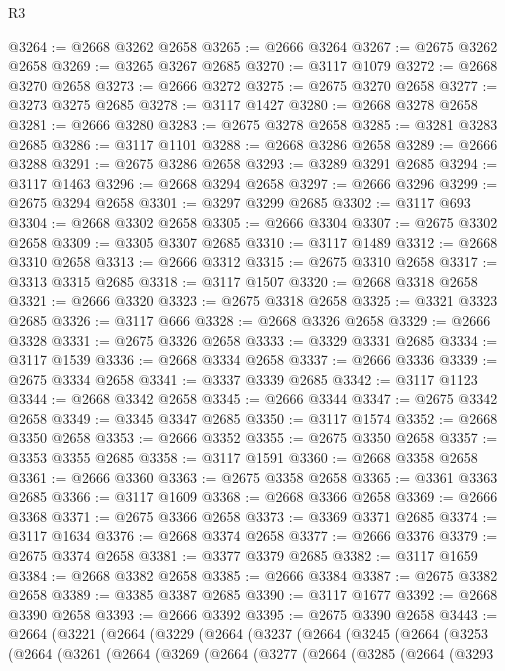 \begin{lexlean}{R3}
\begin{coremodule}
@3264 := @2668 @3262 @2658
@3265 := @2666 @3264
@3267 := @2675 @3262 @2658
@3269 := @3265 @3267 @2685
@3270 := @3117 @1079
@3272 := @2668 @3270 @2658
@3273 := @2666 @3272
@3275 := @2675 @3270 @2658
@3277 := @3273 @3275 @2685
@3278 := @3117 @1427
@3280 := @2668 @3278 @2658
@3281 := @2666 @3280
@3283 := @2675 @3278 @2658
@3285 := @3281 @3283 @2685
@3286 := @3117 @1101
@3288 := @2668 @3286 @2658
@3289 := @2666 @3288
@3291 := @2675 @3286 @2658
@3293 := @3289 @3291 @2685
@3294 := @3117 @1463
@3296 := @2668 @3294 @2658
@3297 := @2666 @3296
@3299 := @2675 @3294 @2658
@3301 := @3297 @3299 @2685
@3302 := @3117 @693
@3304 := @2668 @3302 @2658
@3305 := @2666 @3304
@3307 := @2675 @3302 @2658
@3309 := @3305 @3307 @2685
@3310 := @3117 @1489
@3312 := @2668 @3310 @2658
@3313 := @2666 @3312
@3315 := @2675 @3310 @2658
@3317 := @3313 @3315 @2685
@3318 := @3117 @1507
@3320 := @2668 @3318 @2658
@3321 := @2666 @3320
@3323 := @2675 @3318 @2658
@3325 := @3321 @3323 @2685
@3326 := @3117 @666
@3328 := @2668 @3326 @2658
@3329 := @2666 @3328
@3331 := @2675 @3326 @2658
@3333 := @3329 @3331 @2685
@3334 := @3117 @1539
@3336 := @2668 @3334 @2658
@3337 := @2666 @3336
@3339 := @2675 @3334 @2658
@3341 := @3337 @3339 @2685
@3342 := @3117 @1123
@3344 := @2668 @3342 @2658
@3345 := @2666 @3344
@3347 := @2675 @3342 @2658
@3349 := @3345 @3347 @2685
@3350 := @3117 @1574
@3352 := @2668 @3350 @2658
@3353 := @2666 @3352
@3355 := @2675 @3350 @2658
@3357 := @3353 @3355 @2685
@3358 := @3117 @1591
@3360 := @2668 @3358 @2658
@3361 := @2666 @3360
@3363 := @2675 @3358 @2658
@3365 := @3361 @3363 @2685
@3366 := @3117 @1609
@3368 := @2668 @3366 @2658
@3369 := @2666 @3368
@3371 := @2675 @3366 @2658
@3373 := @3369 @3371 @2685
@3374 := @3117 @1634
@3376 := @2668 @3374 @2658
@3377 := @2666 @3376
@3379 := @2675 @3374 @2658
@3381 := @3377 @3379 @2685
@3382 := @3117 @1659
@3384 := @2668 @3382 @2658
@3385 := @2666 @3384
@3387 := @2675 @3382 @2658
@3389 := @3385 @3387 @2685
@3390 := @3117 @1677
@3392 := @2668 @3390 @2658
@3393 := @2666 @3392
@3395 := @2675 @3390 @2658
@3443 := @2664
    (@3221
      (@2664
        (@3229
          (@2664
            (@3237
              (@2664
                (@3245
                  (@2664
                    (@3253
                      (@2664
                        (@3261
                          (@2664
                            (@3269
                              (@2664
                                (@3277
                                  (@2664
                                    (@3285
                                      (@2664
                                        (@3293

\end{coremodule}
\end{lexlean}
